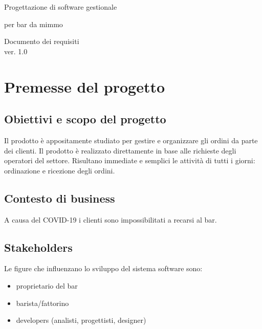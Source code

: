 \documentclass[a4paper,11pt]{article}       %
\begin{document}
\begin{titlepage}
    \centering
        \vspace*{1in}
        \begin{Large}
            Progettazione di software gestionale
  
            per bar da mimmo\par
        \end{Large} 
        \vspace{1.5in}
        \vfill
        Documento dei requisiti\\
        \vspace{0.1in}ver. 1.0
        \par
        \vspace{0.5in}
            \date{05/12/2020}
        \par
\end{titlepage}


\tableofcontents
\newpage


\section{Premesse del progetto}
    \subsection{Obiettivi e scopo del progetto}
    Il prodotto è appositamente studiato per gestire e organizzare gli ordini da parte dei clienti. Il prodotto è realizzato direttamente in base alle richieste degli operatori del settore. Risultano immediate e semplici le attività di tutti i giorni: ordinazione e ricezione degli ordini.
    
    \subsection{Contesto di business}
    A causa del COVID-19 i clienti sono impossibilitati a recarsi al bar.
    
    \subsection{Stakeholders}
    Le figure che influenzano lo sviluppo del sistema software sono:
    \begin{itemize}
        \item proprietario del bar
        \item barista/fattorino
        \item developers (analisti, progettisti, designer)
    \end{itemize}
    
\end{document}

